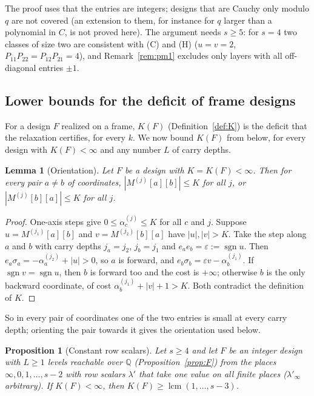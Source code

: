 \documentclass[11pt]{amsart}
\newtheorem{proposition}[theorem]{Proposition}
\newtheorem{lemma}[theorem]{Lemma}
\theoremstyle{definition}
\theoremstyle{plain}
\DeclareMathOperator{\sgn}{sgn}
\begin{document}
The proof uses that the entries are integers; designs that are Cauchy only modulo $q$ are not covered (an extension to them, for instance for $q$ larger than a polynomial in $C$, is not proved here). The argument needs $s\ge5$: for $s=4$ two classes of size two are consistent with (C) and (H) ($u=v=2$, $P_{11}P_{22}=P_{12}P_{21}=4$), and Remark~\ref{rem:pm1} excludes only layers with all off-diagonal entries $\pm1$.


\subsection{Lower bounds for the deficit of frame designs}\label{sec:Lstar}
For a design $F$ realized on a frame, $K(F)$ (Definition~\ref{def:K}) is the deficit that the relaxation certifies, for every $k$. We now bound $K(F)$ from below, for every design with $K(F)<\infty$ and any number $L$ of carry depths.

\begin{lemma}[Orientation]\label{lem:O}
Let $F$ be a design with $K=K(F)<\infty$. Then for every pair $a\ne b$ of coordinates, $|M^{(j)}[a][b]|\le K$ for all $j$, or $|M^{(j)}[b][a]|\le K$ for all $j$.
\end{lemma}

\begin{proof}
One-axis steps give $0\le\alpha^{(j)}_c\le K$ for all $c$ and $j$. Suppose $u=M^{(j_1)}[a][b]$ and $v=M^{(j_2)}[b][a]$ have $|u|,|v|>K$. Take the step along $a$ and $b$ with carry depths $j_a=j_2$, $j_b=j_1$ and $e_ae_b=\varepsilon:=\sgn u$. Then $e_a\sigma_a=-\alpha^{(j_2)}_a+|u|>0$, so $a$ is forward, and $e_b\sigma_b=\varepsilon v-\alpha^{(j_1)}_b$. If $\sgn v=\sgn u$, then $b$ is forward too and the cost is $+\infty$; otherwise $b$ is the only backward coordinate, of cost $\alpha^{(j_1)}_b+|v|+1>K$. Both contradict the definition of $K$.
\end{proof}

So in every pair of coordinates one of the two entries is small at every carry depth; orienting the pair towards it gives the orientation used below.

\begin{proposition}[Constant row scalars]\label{prop:E}
Let $s\ge4$ and let $F$ be an integer design with $L\ge1$ levels reachable over $\mathbb Q$ (Proposition~\ref{prop:F}) from the places $\infty,0,1,\dots,s-2$ with row scalars $\lambda'$ that take one value on all finite places ($\lambda'_\infty$ arbitrary). If $K(F)<\infty$, then $K(F)\ge\operatorname{lcm}(1,\dots,s-3)$.
\end{proposition}
\end{document}
